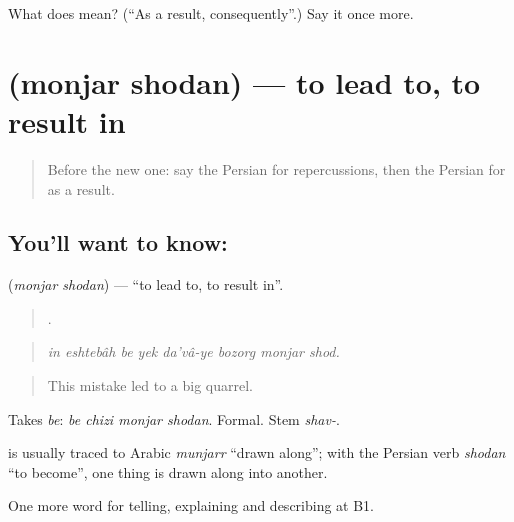 \begin{tcolorbox}[breakable,colback=teal!4,colframe=teal!35!black,title={Before you move on}]
What does   mean? (\textquotedblleft{}As a result, consequently\textquotedblright{}.) Say it once more.
\end{tcolorbox}
\section[\texorpdfstring{\fa{منجر} \fa{شدن} (monjar shodan)}{منجر شدن (monjar shodan)}]{  (monjar shodan) — to lead to, to result in}

\label{lesson:FA-C370-monjar-shodan}



\begin{quote}
Before the new one: say the Persian for repercussions, then the Persian for as a result.
\end{quote}

\subsection*{You'll want to know:  }
\textbf{ } (\emph{monjar shodan}) — \textquotedblleft{}to lead to, to result in\textquotedblright{}.

\begin{quote}
       .
\end{quote}

\begin{quote}
\emph{in eshtebâh be yek da'vâ-ye bozorg monjar shod.}
\end{quote}

\begin{quote}
This mistake led to a big quarrel.
\end{quote}

Takes \emph{be}: \emph{be chizi monjar shodan}. Formal. Stem \emph{shav-}.

\begin{cousinweb}
\textbf{} is usually traced to Arabic \emph{munjarr} \textquotedblleft{}drawn along\textquotedblright{}; with the Persian verb \emph{shodan} \textquotedblleft{}to become\textquotedblright{}, one thing is drawn along into another.
\end{cousinweb}

\begin{grammarlens}[title={What you've built}]
One more word for telling, explaining and describing at B1.
\end{grammarlens}

